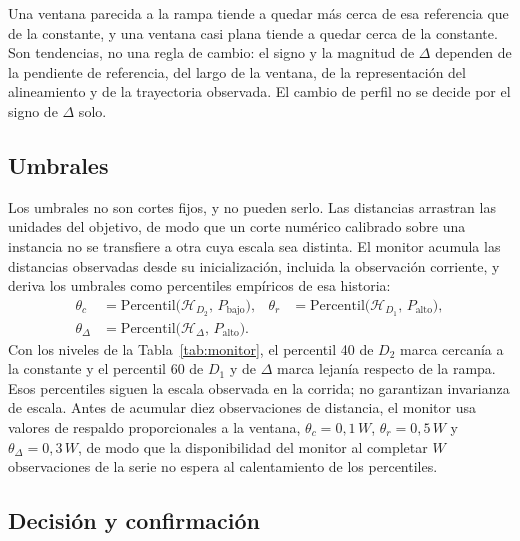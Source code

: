 \documentclass[runningheads]{llncs}
\begin{document}
Una ventana parecida a la rampa tiende a quedar más cerca de esa referencia que de la constante, y una ventana casi plana tiende a quedar cerca de la constante. Son tendencias, no una regla de cambio: el signo y la magnitud de $\Delta$ dependen de la pendiente de referencia, del largo de la ventana, de la representación del alineamiento y de la trayectoria observada. El cambio de perfil no se decide por el signo de $\Delta$ solo.

\subsection{Umbrales}
\label{sec:umbrales}

Los umbrales no son cortes fijos, y no pueden serlo. Las distancias arrastran las unidades del objetivo, de modo que un corte numérico calibrado sobre una instancia no se transfiere a otra cuya escala sea distinta. El monitor acumula las distancias observadas desde su inicialización, incluida la observación corriente, y deriva los umbrales como percentiles empíricos de esa historia:
\begin{align}
\theta_c &= \mathrm{Percentil}\bigl(\mathcal{H}_{D_2},\, P_{\mathrm{bajo}}\bigr), &
\theta_r &= \mathrm{Percentil}\bigl(\mathcal{H}_{D_1},\, P_{\mathrm{alto}}\bigr), \nonumber \\
\theta_{\Delta} &= \mathrm{Percentil}\bigl(\mathcal{H}_{\Delta},\, P_{\mathrm{alto}}\bigr).
\label{eq:umbrales}
\end{align}
Con los niveles de la Tabla~\ref{tab:monitor}, el percentil 40 de $D_2$ marca cercanía a la constante y el percentil 60 de $D_1$ y de $\Delta$ marca lejanía respecto de la rampa. Esos percentiles siguen la escala observada en la corrida; no garantizan invarianza de escala. Antes de acumular diez observaciones de distancia, el monitor usa valores de respaldo proporcionales a la ventana, $\theta_c = 0{,}1\,W$, $\theta_r = 0{,}5\,W$ y $\theta_{\Delta} = 0{,}3\,W$, de modo que la disponibilidad del monitor al completar $W$ observaciones de la serie no espera al calentamiento de los percentiles.

\subsection{Decisión y confirmación}
\label{sec:decision}
\end{document}
